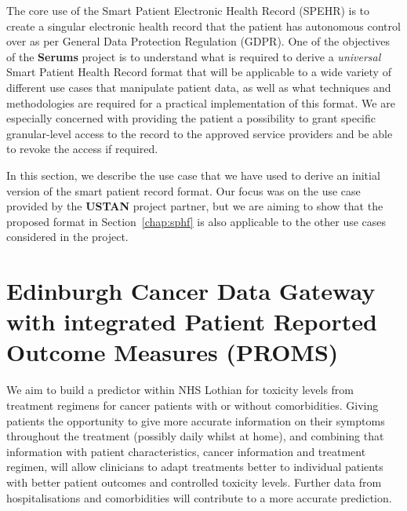 The core use of the Smart Patient Electronic Health Record (SPEHR) is to create a singular electronic health record that the patient has autonomous control over as per General Data Protection Regulation (GDPR). \cite{InformationCommissionersOffice2018}
One of the objectives of the \textbf{Serums} project is to understand what is required to derive a \emph{universal} Smart Patient Health Record format that will be applicable to a wide variety of different use cases that manipulate patient data, as well as what techniques and methodologies are required for a practical implementation of this format. We are especially concerned with providing the patient a possibility to grant specific granular-level access to the record to the approved service providers and be able to revoke the access if required.

In this section, we describe the use case that we have used to derive an initial version of the smart patient record format. Our focus was on the use case provided by the \textbf{USTAN} project partner, but we are aiming to show that the proposed format in Section~\ref{chap:sphf} is also applicable to the other use cases considered in the project.

\section{Edinburgh Cancer Data Gateway with integrated Patient Reported Outcome Measures (PROMS)} 
\label{sec:usecasecancer}
We aim to build a predictor within NHS Lothian for toxicity levels from treatment regimens for cancer patients with or without comorbidities. Giving patients the opportunity to give more accurate information on their symptoms throughout the treatment (possibly daily whilst at home), and combining that information with patient characteristics, cancer information and treatment regimen, will allow clinicians to adapt treatments better to individual patients with better patient outcomes and controlled toxicity levels. Further data from hospitalisations and comorbidities will contribute to a more accurate prediction.



